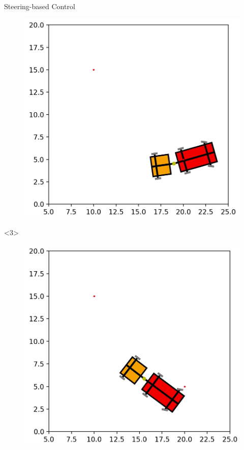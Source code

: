 \begin{frame}{Steering-based Control}
\begin{onlyenv}
\begin{minipage}{.55\textwidth}
\begin{onlyenv}
\begin{figure}[H]
        \includegraphics[width=\textwidth]{images/snapshot2}
        \label{fig:points}
    \end{figure}
    \end{onlyenv}
    \begin{onlyenv}<3>
    \begin{figure}[H]
        \centering
        \includegraphics[width=\textwidth]{images/snapshot3}

\end{figure}
\end{onlyenv}
\end{minipage}
\end{onlyenv}
\end{frame}
